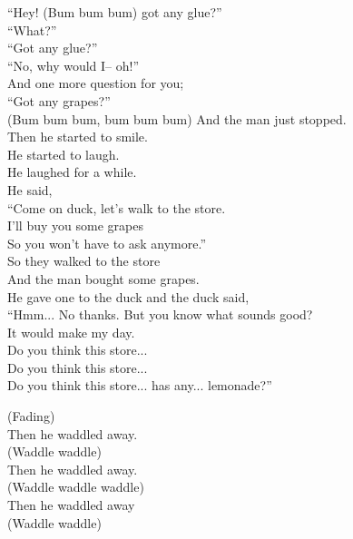 ``Hey! (Bum bum bum) got any glue?''\\
``What?''\\
``Got any glue?''\\
``No, why would I– oh!''\\
And one more question for you;\\
``Got any grapes?''\\
(Bum bum bum, bum bum bum)
\newpage
And the man just stopped.\\
Then he started to smile.\\
He started to laugh.\\
He laughed for a while.\\
He said,\\
``Come on duck, let’s walk to the store.\\
I’ll buy you some grapes\\
So you won't have to ask anymore.''\\
So they walked to the store\\
And the man bought some grapes.\\
He gave one to the duck and the duck said,\\
``Hmm... No thanks. But you know what sounds good?\\
It would make my day.\\
Do you think this store...\\
Do you think this store...\\
Do you think this store... has any... lemonade?''\par
\vspace{10pt}
(Fading)\\
Then he waddled away.\\
(Waddle waddle)\\
Then he waddled away.\\
(Waddle waddle waddle)\\
Then he waddled away\\
(Waddle waddle)
